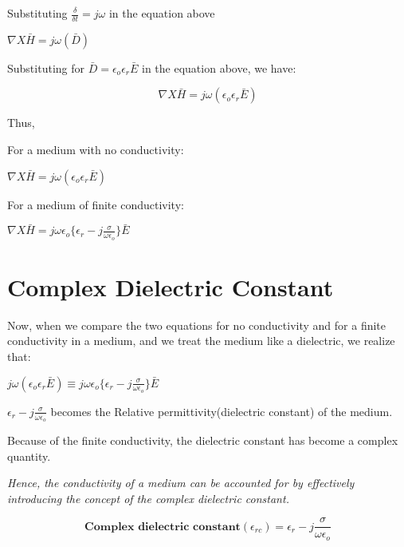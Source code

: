 Substituting $\frac{\delta}{\delta t} = j\omega$ in the equation above

\begin{center}
$\nabla X \bar{H} = j \omega(\bar{D})$
\end{center}

Substituting for $\bar{D} = \epsilon_{o}\epsilon_{r}\bar{E}$ in the equation above, we have:

\begin{equation}
\nabla X \bar{H} = j \omega(\epsilon_{o}\epsilon_{r}\bar{E})
\end{equation}



Thus,

For a medium with no conductivity:
\begin{center}
$\nabla X \bar{H} = j \omega(\epsilon_{o}\epsilon_{r}\bar{E})$
\end{center}

For a medium of finite conductivity:
\begin{center}
$\nabla X \bar{H} = j\omega\epsilon_{o}\bigg\{\epsilon_{r} -j \frac{\sigma}{\omega\epsilon_{o}}\bigg\}\bar{E}$ 
\end{center}

\section{Complex Dielectric Constant}
Now, when we compare the two equations for no conductivity and for a finite conductivity in a medium, and we treat the medium like a dielectric, we realize that:

\begin{center}
$j \omega(\epsilon_{o}\epsilon_{r}\bar{E}) \equiv j\omega\epsilon_{o}\bigg\{\epsilon_{r} -j \frac{\sigma}{\omega\epsilon_{o}}\bigg\}\bar{E}$ 
\end{center}

\textbf{$\epsilon_{r} -j \frac{\sigma}{\omega\epsilon_{o}}$} becomes the Relative permittivity(dielectric constant) of the medium.

Because of the finite conductivity, the dielectric constant has become a complex quantity.

\textit{Hence, the conductivity of a medium can be accounted for by effectively introducing the concept of the complex dielectric constant.}

\begin{equation}
\textbf{Complex dielectric constant} (\epsilon_{rc}) = \epsilon_{r} -j \frac{\sigma}{\omega\epsilon_{o}}
\end{equation}

